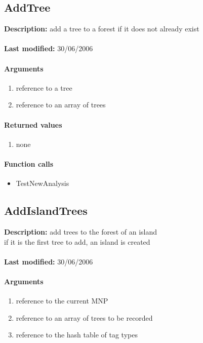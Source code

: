 \subsection{AddTree}
\textbf{Description:} add a tree to a forest if it does not already exist\\
\\\textbf{Last modified:} 30/06/2006

\paragraph{Arguments}
\begin{enumerate}
\item reference to a tree
\item reference to an array of trees
\end{enumerate}

\paragraph{Returned values}
\begin{enumerate}
\item none
\end{enumerate}

\paragraph{Function calls}
\begin{itemize}
\item TestNewAnalysis
\end{itemize}

\subsection{AddIslandTrees}
\textbf{Description:} add trees to the forest of an island\\
if it is the first tree to add, an island is created\\
\\\textbf{Last modified:} 30/06/2006

\paragraph{Arguments}
\begin{enumerate}
\item reference to the current MNP
\item reference to an array of trees to be recorded
\item reference to the hash table of tag types
\end{enumerate}

